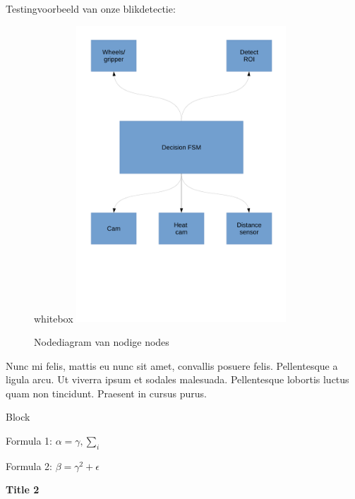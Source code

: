 \documentclass{beamer}
\begin{document}
\begin{frame}[t]
\begin{columns}[t]
	\begin{column}{.49\textwidth}
	Testingvoorbeeld van onze blikdetectie:
	\begin{figure}
	 \begin{beamercolorbox}{whitebox}
	  \centering
	  \includegraphics[width=0.7\textwidth]{../../Docs/node_diagram.pdf}
	  \caption{Nodediagram van nodige nodes}
	 \end{beamercolorbox}

	\end{figure}
		\justifying
		Nunc mi felis, mattis eu nunc sit amet, convallis posuere felis. Pellentesque a ligula arcu. Ut viverra ipsum et sodales malesuada. Pellentesque lobortis luctus quam non tincidunt. Praesent in cursus purus. 
		
			\begin{block}{Block}
			\begin{center}
			Formula 1: \hspace{2em}	$\alpha=\gamma, \sum_{i}$
			
			Formula 2:	\hspace{2em} $\beta=\gamma^2+\epsilon$
			\end{center}
			\end{block}
	
		\vspace{0.5em}
		{\bfseries Title 2}
		

\end{column}
\end{columns}
\end{frame}
\end{document}
